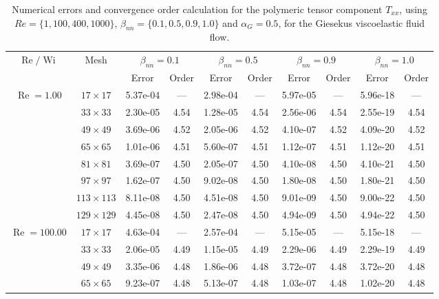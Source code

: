 \documentclass[preprint, 12pt]{elsarticle}
\begin{document}
\begin{center}
\begin{table}[H]
\caption{Numerical errors and convergence order calculation for the polymeric tensor component $T_{xx}$, using $Re=\{1,100,400,1000\}$, $\beta_{nn}=\{0.1,0.5,0.9,1.0\}$ and \mbox{$\alpha_G = 0.5$}, for the Giesekus viscoelastic fluid flow.\label{tab_GiesekusTxxalphaG05Wi5_10}}
\tiny{
    \begin{tabular*}{\textwidth}{@{\extracolsep\fill}cccccccccc@{}}
    \hline
    \multirow{2}{*}{$\operatorname{Re}/\operatorname{Wi}$} & \multirow{2}{*}{Mesh} & \multicolumn{2}{c}{$\beta_{nn}=0.1$}  & \multicolumn{2}{c}{$\beta_{nn}=0.5$}  & \multicolumn{2}{c}{$\beta_{nn}=0.9$}  & \multicolumn{2}{c}{$\beta_{nn}=1.0$}\\ %
     & & Error & Order & Error & Order & Error & Order & Error & Order \\
    \hline
    \multirow{7}{*}{$\operatorname{Re}=1.00$} & $17\times 17$ & 5.37e-04 & --- & 2.98e-04 & --- & 5.97e-05 & --- & 5.96e-18 & --- \\
    & $33\times 33$ & 2.30e-05 & 4.54 & 1.28e-05 & 4.54 & 2.56e-06 & 4.54 & 2.55e-19 & 4.54 \\
    & $49\times 49$ & 3.69e-06 & 4.52 & 2.05e-06 & 4.52 & 4.10e-07 & 4.52 & 4.09e-20 & 4.52 \\
    \multirow{3}{*}{$\operatorname{Wi}=5$} & $65\times 65$ & 1.01e-06 & 4.51 & 5.60e-07 & 4.51 & 1.12e-07 & 4.51 & 1.12e-20 & 4.51 \\
    & $81\times 81$ & 3.69e-07 & 4.50 & 2.05e-07 & 4.50 & 4.10e-08 & 4.50 & 4.10e-21 & 4.50 \\
    & $97\times 97$ & 1.62e-07 & 4.50 & 9.02e-08 & 4.50 & 1.80e-08 & 4.50 & 1.80e-21 & 4.50 \\
    & $113\times 113$ & 8.11e-08 & 4.50 & 4.51e-08 & 4.50 & 9.01e-09 & 4.50 & 9.00e-22 & 4.50 \\
    & $129\times 129$ & 4.45e-08 & 4.50 & 2.47e-08 & 4.50 & 4.94e-09 & 4.50 & 4.94e-22 & 4.50 \\
    \hline
    \multirow{7}{*}{$\operatorname{Re}=100.00$} & $17\times 17$ & 4.63e-04 & --- & 2.57e-04 & --- & 5.15e-05 & --- & 5.15e-18 & --- \\
    & $33\times 33$ & 2.06e-05 & 4.49 & 1.15e-05 & 4.49 & 2.29e-06 & 4.49 & 2.29e-19 & 4.49 \\
    & $49\times 49$ & 3.35e-06 & 4.48 & 1.86e-06 & 4.48 & 3.72e-07 & 4.48 & 3.72e-20 & 4.48 \\
    \multirow{3}{*}{$\operatorname{Wi}=5$} & $65\times 65$ & 9.23e-07 & 4.48 & 5.13e-07 & 4.48 & 1.03e-07 & 4.48 & 1.02e-20 & 4.48 \\

\end{tabular*}}
\end{table}
\end{center}
\end{document}
